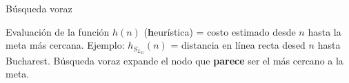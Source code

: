 \begin{frame}{Búsqueda voraz}
\begin{center}
Evaluación de la función \(h(n)\) (\textbf{h}eurística) = costo estimado desde \(n\) hasta la meta más cercana.  \newline
\newline
Ejemplo: \(h_S_L_D(n)\) = distancia en línea recta desed \(n\) hasta Bucharest. \newline
\newline
Búsqueda voraz expande el nodo que \textbf{parece} ser el más cercano a la meta.
\end{center}
\end{frame}
 